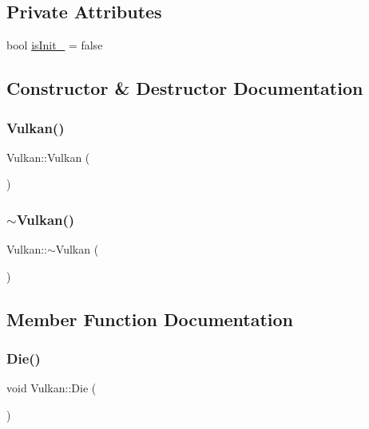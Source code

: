 \subsection*{Private Attributes}
\begin{DoxyCompactItemize}
\item 
bool \mbox{\hyperlink{classVulkan_aa19833e837744cc2f6b1f93c1d66a693}{is\+Init\+\_\+}} = false
\end{DoxyCompactItemize}


\subsection{Constructor \& Destructor Documentation}
\mbox{\label{classVulkan_a69c8a0222ecd2f24887acc75a7ffd922}} 
\subsubsection{\texorpdfstring{Vulkan()}{Vulkan()}}
{\footnotesize\ttfamily Vulkan\+::\+Vulkan (\begin{DoxyParamCaption}{ }\end{DoxyParamCaption})}

\mbox{\label{classVulkan_a85f20d6cd141ec9568d812cfdf81971f}} 
\subsubsection{\texorpdfstring{$\sim$\+Vulkan()}{~Vulkan()}}
{\footnotesize\ttfamily Vulkan\+::$\sim$\+Vulkan (\begin{DoxyParamCaption}{ }\end{DoxyParamCaption})\hspace{0.3cm}{\ttfamily [virtual]}}



\subsection{Member Function Documentation}
\mbox{\label{classVulkan_a728e47da1e42d65c6d9efa5106f6d13b}} 
\subsubsection{\texorpdfstring{Die()}{Die()}}
{\footnotesize\ttfamily void Vulkan\+::\+Die (\begin{DoxyParamCaption}{ }\end{DoxyParamCaption})}

